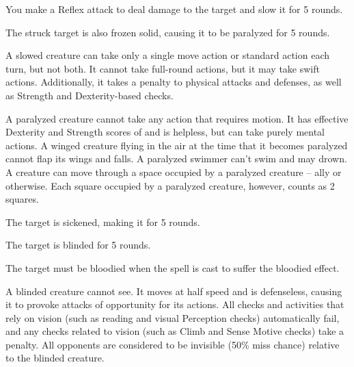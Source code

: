 \spellrng{\rngclose}
\begin{spellhealthy}
    You make a Reflex attack to deal damage to the target and slow it for 5 rounds.
\end{spellhealthy}
\begin{spellblood}
    The struck target is also frozen solid, causing it to be paralyzed for 5 rounds.
\end{spellblood}
\begin{spellnotes}
A slowed creature can take only a single move action or standard action each turn, but not both. It cannot take full-round actions, but it may take swift actions. Additionally, it takes a  penalty to physical attacks and defenses, as well as Strength and Dexterity-based checks.

   A paralyzed creature cannot take any action that requires motion. It has effective Dexterity and Strength scores of  and is helpless, but can take purely mental actions. A winged creature flying in the air at the time that it becomes paralyzed cannot flap its wings and falls. A paralyzed swimmer can't swim and may drown. A creature can move through a space occupied by a paralyzed creature -- ally or otherwise. Each square occupied by a paralyzed creature, however, counts as 2 squares.
 \end{spellnotes}

\spellrng{\rngclose}
\begin{spellhealthy}
  The target is sickened, making it \vulnerable for 5 rounds.
\end{spellhealthy}
\begin{spellblood}
  The target is blinded for 5 rounds.
\end{spellblood}
\begin{spellnotes}
  The target must be bloodied when the spell is cast to suffer the bloodied effect.

A blinded creature cannot see. It moves at half speed and is defenseless, causing it to provoke attacks of opportunity for its actions. All checks and activities that rely on vision (such as reading and visual Perception checks) automatically fail, and any checks related to vision (such as Climb and Sense Motive checks) take a  penalty. All opponents are considered to be invisible (50\% miss chance) relative to the blinded creature.
\end{spellnotes}

